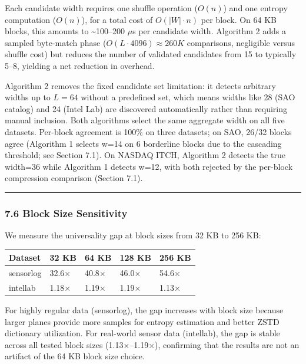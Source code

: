 \documentclass[
  11pt,
  letterpaper,
]{article}
\makeatletter
\renewcommand{\_}{\bpd@origunderscore\allowbreak}
\makeatother
\begin{document}
Each candidate width requires one shuffle operation (\(O(n)\)) and one
entropy computation (\(O(n)\)), for a total cost of \(O(|W| \cdot n)\)
per block. On 64 KB blocks, this amounts to \textasciitilde100--200
\(\mu\)s per candidate width. Algorithm 2 adds a sampled byte-match
phase (\(O(L \cdot 4096) \approx 260K\) comparisons, negligible versus
shuffle cost) but reduces the number of validated candidates from 15 to
typically 5--8, yielding a net reduction in overhead.

Algorithm 2 removes the fixed candidate set limitation: it detects
arbitrary widths up to \(L = 64\) without a predefined set, which means
widths like 28 (SAO catalog) and 24 (Intel Lab) are discovered
automatically rather than requiring manual inclusion. Both algorithms
select the same aggregate width on all five datasets. Per-block
agreement is 100\% on three datasets; on SAO, 26/32 blocks agree
(Algorithm 1 selects w=14 on 6 borderline blocks due to the cascading
threshold; see Section 7.1). On NAS\-DAQ ITCH, Algorithm 2 detects the
true width=36 while Algorithm 1 detects w=12, with both rejected by the
per-block compression comparison (Section 7.1).

\begin{center}\rule{0.5\linewidth}{0.5pt}\end{center}

\hypertarget{block-size-sensitivity}{%
\subsubsection{7.6 Block Size
Sensitivity}\label{block-size-sensitivity}}

We measure the universality gap at block sizes from 32 KB to 256 KB:

\begin{longtable}[]{@{}lllll@{}}
\toprule\noalign{}
Dataset & 32 KB & 64 KB & 128 KB & 256 KB \\
\midrule\noalign{}
\endhead
\bottomrule\noalign{}
\endlastfoot
sensor\_log & 32.6× & 40.8× & 46.0× & 54.6× \\
intel\_lab & 1.18× & 1.19× & 1.19× & 1.13× \\
\end{longtable}

For highly regular data (sensor\_log), the gap increases with block size
because larger planes provide more samples for entropy estimation and
better ZSTD dictionary utilization. For real-world sensor data
(intel\_lab), the gap is stable across all tested block sizes
(1.13×--1.19×), confirming that the results are not an artifact of the
64 KB block size choice.
\end{document}
